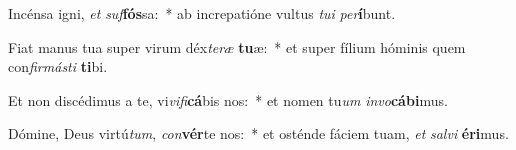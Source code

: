 \item Incénsa igni, \textit{et} \textit{suf}\textbf{fós}sa:~* ab increpatióne vultus \textit{tu}\textit{i} \textit{per}\textbf{í}bunt.
\item Fiat manus tua super virum déx\textit{te}\textit{ræ} \textbf{tu}æ:~* et super fílium hóminis quem con\textit{fir}\textit{más}\textit{ti} \textbf{ti}bi.
\item Et non discédimus a te, vi\textit{vi}\textit{fi}\textbf{cá}bis nos:~* et nomen tu\textit{um} \textit{in}\textit{vo}\textbf{cá}\textbf{bi}mus.
\item Dómine, Deus virtú\textit{tum}, \textit{con}\textbf{vér}te nos:~* et osténde fáciem tuam, \textit{et} \textit{sal}\textit{vi} \textbf{é}\textbf{ri}mus.
